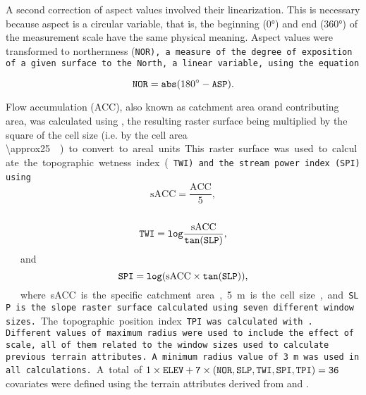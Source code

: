 \noindent A second correction of aspect values involved their linearization. This is necessary because aspect 
is a circular variable, that is, the beginning (\ang{0}) and end (\ang{360}) of the measurement scale have the 
same physical meaning. Aspect values were transformed to northernness (\tt{NOR}), a measure of the degree 
of exposition of a given surface to the North, a linear variable, using the equation

\begin{equation}
 \tt{NOR} = abs(\ang{180} - \tt{ASP}).
\end{equation}\label{eq:NOR}  

Flow accumulation (ACC), also known as catchment area orand contributing area, was calculated using 
, the resulting raster surface being multiplied by the square of the cell size (i.e. by the 
cell area \SI{\approx25}{\metre\square}) to convert to areal units. This raster 
surface was used to calculate the topographic wetness index (\tt{TWI}) and the stream power index (\tt{SPI}) 
using

\begin{equation}
 \text{sACC} = \dfrac{\text{ACC}}{5},
\end{equation}\label{eq:sACC}

\begin{equation}
 \tt{TWI} = log \dfrac{\text{sACC}}{tan(\tt{SLP})},
\end{equation}\label{eq:TWI}

\noindent and

\begin{equation}
 \tt{SPI} = log(\text{sACC} \times tan(\tt{SLP})),
\end{equation}\label{eq:SPI}

\noindent where sACC is the specific catchment area, \SI{5}{\m} is the cell size, and \tt{SLP} is the slope 
raster surface calculated using seven different window sizes.

The topographic position index \tt{TPI} was calculated with . Different values of 
maximum radius were used to include the effect of scale, all of them related to the window sizes used to 
calculate previous terrain attributes. A minimum radius value of \SI{3}{\m} was used in all calculations.

A total of $1 \times \tt{ELEV} + 7 \times (\tt{NOR}, \tt{SLP}, \tt{TWI}, \tt{SPI}, \tt{TPI}) = 36$ covariates 
were defined using the terrain attributes derived from \demOld{} and \demNew{}.

